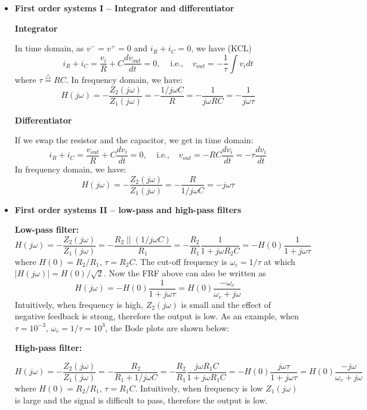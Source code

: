\begin{itemize}

\item {\bf First order systems I -- Integrator and differentiator}


{\bf Integrator}

In time domain, as $v^-=v^+=0$ and $i_R+i_C=0$, we have (KCL)
\[ i_R+i_C=\frac{v_i}{R}+C\frac{d v_{out}}{dt}=0,
\;\;\;\; \mbox{i.e.,}\;\;\;\;v_{out}=-\frac{1}{\tau} \int v_i dt	\]
where $\tau \stackrel{\triangle}{=}RC$. In frequency domain, we have:
\[ H(j\omega)=-\frac{Z_2(j\omega)}{Z_1(j\omega)}=-\frac{1/j\omega C}{R}
=-\frac{1}{j\omega RC}=-\frac{1}{j\omega \tau}	\]

{\bf Differentiator}

If we swap the resistor and the capacitor, we get in time domain:
\[ i_R+i_C=\frac{v_{out}}{R}+C\frac{d v_i}{dt}=0,\;\;\;\;
\mbox{i.e.,}\;\;\;\;v_{out}=-RC \frac{d v_i}{dt}=-\tau \frac{d v_i}{dt}	\]
In frequency domain, we have:
\[ H(j\omega)=-\frac{Z_2(j\omega)}{Z_1(j\omega)}=-\frac{R}{1/j\omega C}
  =-j\omega \tau \]

\item {\bf First order systems II -- low-pass and high-pass filters}


{\bf Low-pass filter:}
\[ 
H(j\omega)=-\frac{Z_2(j\omega)}{Z_1(j\omega)}=-\frac{R_2\;||\;(1/j\omega C)}{R_1}
=-\frac{R_2}{R_1}\frac{1}{1+j\omega R_2C}
=-H(0)\frac{1}{1+j\omega \tau} 
\]
where $H(0)=R_2/R_1$, $\tau=R_2C$. The cut-off frequency is
$\omega_c=1/\tau$ at which $|H(j\omega)|=H(0)/\sqrt{2}$. Now the
FRF above can also be written as
\[
H(j\omega)=-H(0)\frac{1}{1+j\omega \tau} 
=H(0)\frac{-\omega_c}{\omega_c+j\omega} 
\]
Intuitively, when frequency is high, $Z_2(j\omega)$ is small and the effect 
of negative feedback is strong, therefore the output is low. As an example, 
when $\tau=10^{-3}$, $\omega_c=1/\tau=10^3$, the Bode plots are shown below:


{\bf High-pass filter:}

\[
H(j\omega)=-\frac{Z_2(j\omega)}{Z_1(j\omega)}=-\frac{R_2}{R_1+1/j\omega C}
=-\frac{R_2}{R_1}\frac{j\omega R_1C}{1+j\omega R_1C}
=-H(0)\frac{j\omega \tau}{1+j\omega \tau} 
=H(0)\frac{-j\omega}{\omega_c+j\omega} 
\]
where $H(0)=R_2/R_1$, $\tau=R_1C$. Intuitively, when frequency is low
$Z_1(j\omega)$ is large and the signal is difficult to pass, therefore the 
output is low.


\end{itemize}
